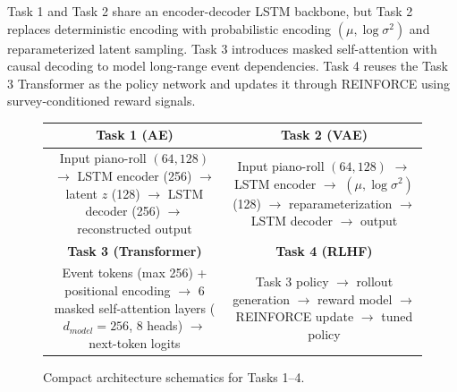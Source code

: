 \documentclass[conference]{IEEEtran}
\begin{document}
Task 1 and Task 2 share an encoder-decoder LSTM backbone, but Task 2 replaces deterministic encoding with probabilistic encoding $(\mu,\log\sigma^2)$ and reparameterized latent sampling. Task 3 introduces masked self-attention with causal decoding to model long-range event dependencies. Task 4 reuses the Task 3 Transformer as the policy network and updates it through REINFORCE using survey-conditioned reward signals.

\begin{figure}[!t]
\centering
\small
\begin{tabular}{|c|c|}
\hline
\textbf{Task 1 (AE)} & \textbf{Task 2 (VAE)} \\
\hline
\begin{minipage}[t]{0.45\columnwidth}\raggedright
Input piano-roll $(64,128)$ \newline $\rightarrow$ LSTM encoder (256) \newline $\rightarrow$ latent $z$ (128) \newline $\rightarrow$ LSTM decoder (256) \newline $\rightarrow$ reconstructed output
\end{minipage} &
\begin{minipage}[t]{0.45\columnwidth}\raggedright
Input piano-roll $(64,128)$ \newline $\rightarrow$ LSTM encoder \newline $\rightarrow$ $(\mu,\log\sigma^2)$ (128) \newline $\rightarrow$ reparameterization \newline $\rightarrow$ LSTM decoder $\rightarrow$ output
\end{minipage} \\
\hline
\textbf{Task 3 (Transformer)} & \textbf{Task 4 (RLHF)} \\
\hline
\begin{minipage}[t]{0.45\columnwidth}\raggedright
Event tokens (max 256) + positional encoding \newline $\rightarrow$ 6 masked self-attention \newline layers ($d_{model}=256$, 8 heads) \newline $\rightarrow$ next-token logits
\end{minipage} &
\begin{minipage}[t]{0.45\columnwidth}\raggedright
Task 3 policy \newline $\rightarrow$ rollout generation \newline $\rightarrow$ reward model \newline $\rightarrow$ REINFORCE update \newline $\rightarrow$ tuned policy
\end{minipage} \\
\hline
\end{tabular}
\caption{Compact architecture schematics for Tasks 1--4.}
\label{fig:task-architectures}
\normalsize
\end{figure}
\end{document}
